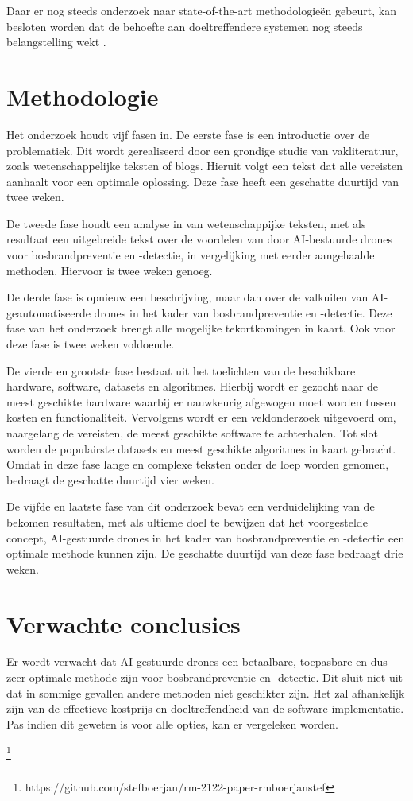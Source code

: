 \documentclass{hogent-article}
\begin{document}
Daar er nog steeds onderzoek naar state-of-the-art methodologieën gebeurt, kan besloten worden dat de behoefte aan doeltreffendere systemen nog steeds belangstelling wekt \autocite{Moumgiakmas2021}.

\section{Methodologie}
Het onderzoek houdt vijf fasen in. De eerste fase is een introductie over de problematiek. Dit wordt gerealiseerd door een grondige studie van vakliteratuur, zoals wetenschappelijke teksten of blogs. Hieruit volgt een tekst dat alle vereisten aanhaalt voor een optimale oplossing. Deze fase heeft een geschatte duurtijd van twee weken.

De tweede fase houdt een analyse in van wetenschappijke teksten, met als resultaat een uitgebreide tekst over de voordelen van door AI-bestuurde drones voor bosbrandpreventie en -detectie, in vergelijking met eerder aangehaalde methoden. 
Hiervoor is twee weken genoeg.

De derde fase is opnieuw een beschrijving, maar dan over de valkuilen van AI-geautomatiseerde drones in het kader van bosbrandpreventie en -detectie.
Deze fase van het onderzoek brengt alle mogelijke tekortkomingen in kaart.
Ook voor deze fase is twee weken voldoende.

De vierde en grootste fase bestaat uit het toelichten van de beschikbare hardware, software, datasets en algoritmes. Hierbij wordt er gezocht naar de meest geschikte hardware waarbij er nauwkeurig afgewogen moet worden tussen kosten en functionaliteit. Vervolgens wordt er een veldonderzoek uitgevoerd om, naargelang de vereisten, de meest geschikte software te achterhalen. Tot slot worden de populairste datasets en meest geschikte algoritmes in kaart gebracht.
Omdat in deze fase lange en complexe teksten onder de loep worden genomen,  bedraagt de geschatte duurtijd vier weken.


De vijfde en laatste fase van dit onderzoek bevat een verduidelijking van de bekomen resultaten, met als ultieme doel te bewijzen dat het voorgestelde concept, AI-gestuurde drones in het kader van bosbrandpreventie en -detectie een optimale methode kunnen zijn. De geschatte duurtijd van deze fase bedraagt drie weken.

\section{Verwachte conclusies}
Er wordt verwacht dat AI-gestuurde drones een betaalbare, toepasbare en dus zeer optimale methode zijn voor bosbrandpreventie en -detectie. Dit sluit niet uit dat in sommige gevallen andere methoden niet geschikter zijn. Het zal afhankelijk zijn van de effectieve kostprijs en doeltreffendheid van de software-implementatie. Pas indien dit geweten is voor alle opties, kan er vergeleken worden.



\printbibliography[heading=bibintoc]
\footnote{https://github.com/stefboerjan/rm-2122-paper-rmboerjanstef}
\end{document}
